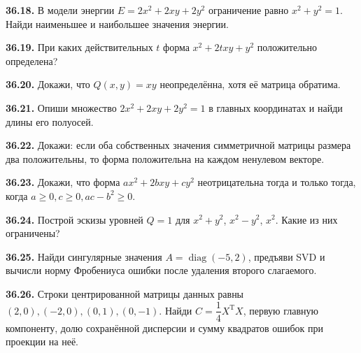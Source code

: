 \noindent\begin{minipage}[t]{\linewidth}\textbf{36.18.}\starmark{} В модели энергии \(E=2x^2+2xy+2y^2\) ограничение равно \(x^2+y^2=1\). Найди наименьшее и наибольшее значения энергии.\par\end{minipage}\par
\noindent\begin{minipage}[t]{\linewidth}\textbf{36.19.} При каких действительных \(t\) форма \(x^2+2txy+y^2\) положительно определена?\par\end{minipage}\par
\noindent\begin{minipage}[t]{\linewidth}\textbf{36.20.} Докажи, что \(Q(x,y)=xy\) неопределённа, хотя её матрица обратима.\par\end{minipage}\par
\noindent\begin{minipage}[t]{\linewidth}\textbf{36.21.} Опиши множество \(2x^2+2xy+2y^2=1\) в главных координатах и найди длины его полуосей.\par\end{minipage}\par
\noindent\begin{minipage}[t]{\linewidth}\textbf{36.22.} Докажи: если оба собственных значения симметричной матрицы размера два положительны, то форма положительна на каждом ненулевом векторе.\par\end{minipage}\par
\noindent\begin{minipage}[t]{\linewidth}\textbf{36.23.}\starmark{} Докажи, что форма \(ax^2+2bxy+cy^2\) неотрицательна тогда и только тогда, когда \(a\ge0,c\ge0,ac-b^2\ge0\).\par\end{minipage}\par
\noindent\begin{minipage}[t]{\linewidth}\textbf{36.24.}\starmark{} Построй эскизы уровней \(Q=1\) для \(x^2+y^2\), \(x^2-y^2\), \(x^2\). Какие из них ограничены?\par\end{minipage}\par
\noindent\begin{minipage}[t]{\linewidth}\textbf{36.25.} Найди сингулярные значения \(A=\operatorname{diag}(-5,2)\), предъяви SVD и вычисли норму Фробениуса ошибки после удаления второго слагаемого.\par\end{minipage}\par
\noindent\begin{minipage}[t]{\linewidth}\textbf{36.26.}\starmark{} Строки центрированной матрицы данных равны \((2,0),(-2,0),(0,1),(0,-1)\). Найди \(C=\dfrac14X^{\mathrm T}X\), первую главную компоненту, долю сохранённой дисперсии и сумму квадратов ошибок при проекции на неё.\par\end{minipage}\par
\endgroup
